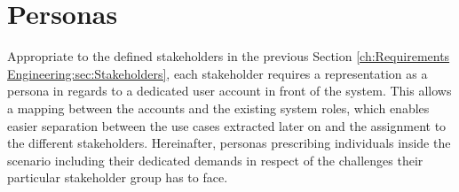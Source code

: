 \section{Personas}
\label{ch:Requirements Engineering:sec:Personas}

Appropriate to the defined stakeholders in the previous Section \ref{ch:Requirements Engineering:sec:Stakeholders}, each stakeholder requires a representation as a persona in regards to a dedicated user account in front of the system.
This allows a mapping between the accounts and the existing system roles, which enables easier separation between the use cases extracted later on and the assignment to the different stakeholders. 
Hereinafter, personas prescribing individuals inside the scenario including their dedicated demands in respect of the challenges their particular stakeholder group has to face. 

\newpage

